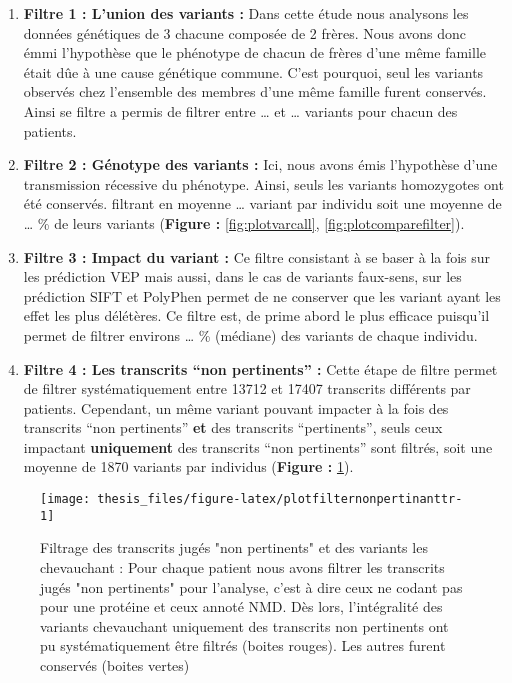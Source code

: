 \documentclass[12pt,twoside]{reedthesis}
\theoremstyle{definition}
\theoremstyle{definition}
\theoremstyle{remark}
\begin{document}
  \begin{enumerate}
  \def\labelenumi{\arabic{enumi}.}
  \item
    \textbf{Filtre 1 : L'union des variants :} Dans cette étude nous
    analysons les données génétiques de 3 chacune composée de 2 frères.
    Nous avons donc émmi l'hypothèse que le phénotype de chacun de frères
    d'une même famille était dûe à une cause génétique commune. C'est
    pourquoi, seul les variants observés chez l'ensemble des membres d'une
    même famille furent conservés. Ainsi se filtre a permis de filtrer
    entre \ldots{} et \ldots{} variants pour chacun des patients.
  \item
    \textbf{Filtre 2 : Génotype des variants :} Ici, nous avons émis
    l'hypothèse d'une transmission récessive du phénotype. Ainsi, seuls
    les variants homozygotes ont été conservés. filtrant en moyenne
    \ldots{} variant par individu soit une moyenne de \ldots{} \% de leurs
    variants (\textbf{Figure : }\ref{fig:plotvarcall},
    \ref{fig:plotcomparefilter}).
  \item
    \textbf{Filtre 3 : Impact du variant :} Ce filtre consistant à se
    baser à la fois sur les prédiction VEP mais aussi, dans le cas de
    variants faux-sens, sur les prédiction SIFT et PolyPhen permet de ne
    conserver que les variant ayant les effet les plus délétères. Ce
    filtre est, de prime abord le plus efficace puisqu'il permet de
    filtrer environs \ldots{} \% (médiane) des variants de chaque
    individu.
  \item
    \textbf{Filtre 4 : Les transcrits ``non pertinents'' :} Cette étape de
    filtre permet de filtrer systématiquement entre 13712 et 17407
    transcrits différents par patients. Cependant, un même variant pouvant
    impacter à la fois des transcrits ``non pertinents'' \textbf{et} des
    transcrits ``pertinents'', seuls ceux impactant \textbf{uniquement}
    des transcrits ``non pertinents'' sont filtrés, soit une moyenne de
    1870 variants par individus (\textbf{Figure :
    }\ref{fig:plotfilternonpertinanttr}).
  \end{enumerate}
  
  \begin{figure}
  
  {\centering \texttt{[image: thesis\_files/figure-latex/plotfilternonpertinanttr-1]} 
  
  }
  
  \caption[Filtrage des transcrits jugés "non pertinents" et des variants les chevauchant]{Filtrage des transcrits jugés "non pertinents" et des variants les chevauchant : Pour chaque patient nous avons filtrer les transcrits jugés "non pertinents" pour l'analyse, c'est à dire ceux ne codant pas pour une protéine et ceux annoté NMD. Dès lors, l'intégralité des variants chevauchant uniquement des transcrits non pertinents ont pu systématiquement être filtrés (boites rouges). Les autres furent conservés (boites vertes)}\label{fig:plotfilternonpertinanttr}
  \end{figure}
  
\end{document}
